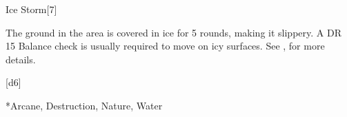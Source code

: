 \begin{spellsection}{Ice Storm}[7]
    \begin{spellheader}
    \end{spellheader}
    \begin{spellcontent}
        \begin{spelltargetinginfo}
        \end{spelltargetinginfo}
        \begin{spelleffects}
            \spelleffect The ground in the area is covered in ice for 5 rounds, making it slippery. A DR 15 Balance check is usually required to move on icy surfaces. See , for more details.
        \end{spelleffects}
    \end{spellcontent}
    \begin{spellsubcontent}
        \begin{spelltargetinginfo}
        \end{spelltargetinginfo}
        \begin{spelleffects}
            \spelleffect {}[d6]
        \end{spelleffects}
    \end{spellsubcontent}
    \begin{spellfooter}
        *{Arcane, Destruction, Nature, Water}
        \spellnotes \destructivespellnotes
        \miscastyou
    \end{spellfooter}
\end{spellsection}

